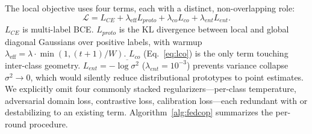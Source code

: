 \documentclass[conference]{IEEEtran}
\theoremstyle{definition}
\begin{document}
The local objective uses four terms, each with a distinct, non-overlapping role:
\begin{equation}
\mathcal{L}=L_{CE}+\lambda_{\text{eff}}L_{proto}+\lambda_{co}L_{co}+\lambda_{ent}L_{ent}.
\label{eq:objective}
\end{equation}
$L_{CE}$ is multi-label BCE. $L_{proto}$ is the KL divergence between local and global diagonal Gaussians over positive labels, with warmup $\lambda_{\text{eff}}{=}\lambda{\cdot}\min(1,(t{+}1)/W)$. $L_{co}$ (Eq.~\ref{eq:lco}) is the only term touching inter-class geometry. $L_{ent}{=}{-}\overline{\log\sigma^{2}}$ ($\lambda_{ent}{=}10^{-3}$) prevents variance collapse $\sigma^{2}{\to}0$, which would silently reduce distributional prototypes to point estimates. We explicitly omit four commonly stacked regularizers---per-class temperature, adversarial domain loss, contrastive loss, calibration loss---each redundant with or destabilizing to an existing term. Algorithm~\ref{alg:fedcop} summarizes the per-round procedure.
\end{document}
